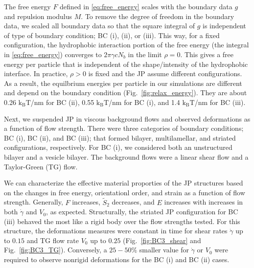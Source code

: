 \documentclass[prb,preprint,showpacs,preprintnumbers,amsmath,amssymb,longbibliography]{revtex4-1}
\begin{document}
The free energy $F$ defined in \eqref{eq:free_energy}
scales with the boundary data $g$ and repulsion modulus $M$.
To remove the degree of freedom in the boundary data,
we scaled all boundary data so that the square integral of $g$ is independent of
type of boundary condition; BC (i), (ii), or (iii).
This way, for a fixed configuration, the hydrophobic interaction portion of the
free energy (the integral in \eqref{eq:free_energy}) converges to $2\pi \gamma c N_b$
in the limit $\rho = 0$.  This gives a free energy per particle that is independent
of the shape/intensity of the hydrophobic interface.  In practice, $\rho > 0$ is fixed
and the JP assume different configurations.  As a result, the equilbrium energies
per particle in our simulations are different and depend on the boundary condition
(Fig.~\ref{fig:relax_energy}).
They are about 0.26 $\mathrm{k_BT}$/nm for BC (ii),
0.55 $\mathrm{k_BT}$/nm for BC (i), and
1.4 $\mathrm{k_BT}$/nm for BC (iii).

Next, we suspended JP in viscous background flows and observed deformations
as a function of flow strength.  There were three categories of boundary
conditions; BC (i), BC (ii), and BC (iii); that formed bilayer, multilamellar, and striated
configurations, respectively. For BC (i), we considered both an unstructured bilayer
and a vesicle bilayer.  The background flows were a linear shear flow and a Taylor-Green (TG) flow.

We can characterize the effective material proporties of the JP structures
based on the changes in free energy, orientationl order, and strain as a function
of flow strength.  Generally, $F$ increases, $\tilde S_2$ decreases, and 
$E$ increases with increases in both $\dot \gamma$ and $V_0$, as expected.
Structurally, the striated JP configuration for BC (iii) behaved the most
like a rigid body over the flow strengths tested.  For this structure,
the deformations measures were constant in time for shear rates $\dot \gamma$ up to
$0.15$ and TG flow rate $V_0$ up to $0.25$
(Fig.~\ref{fig:BC3_shear} and Fig.~\ref{fig:BC3_TG}).
Conversely, a $25 - 50 \%$
smaller value for $\dot \gamma$ or $V_0$ were required to observe
nonrigid deformations for the BC (i) and BC (ii) cases.
\end{document}
